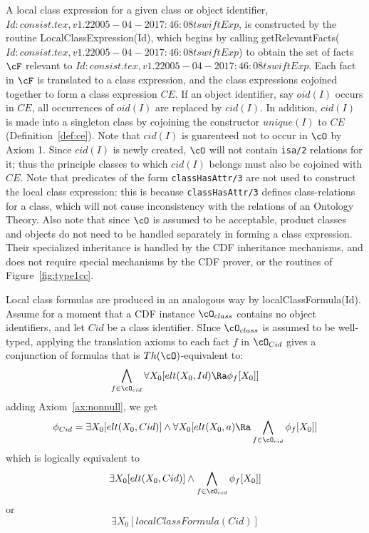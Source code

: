 A local class expression for a given class or object identifier, $Id: consist.tex,v 1.2 2005-04-20 17:46:08 tswift Exp $,
is constructed by the routine {\sf LocalClassExpression(Id)}, which
begins by calling {\sf getRelevantFacts($Id: consist.tex,v 1.2 2005-04-20 17:46:08 tswift Exp $)} to obtain the set of
facts $\cF$ relevant to $Id: consist.tex,v 1.2 2005-04-20 17:46:08 tswift Exp $.  Each fact in $\cF$ is translated to a
class expression, and the class expressions cojoined together to form
a class expression $CE$.  If an object identifier, say $oid(I)$ occurs
in $CE$, all occurrences of $oid(I)$ are replaced by $cid(I)$.  In
addition, $cid(I)$ is made into a singleton class by cojoining the
constructor $unique(I)$ to $CE$ (Definition~\ref{def:ce}).  Note that
$cid(I)$ is guarenteed not to occur in $\cO$ by Axiom 1.  Since
$cid(I)$ is newly created, $\cO$ will not contain {\tt isa/2}
relations for it; thus the principle classes to which $cid(I)$ belongs
must also be cojoined with $CE$.  Note that predicates of the form
{\tt classHasAttr/3} are not used to construct the local class
expression: this is because {\tt classHasAttr/3} defines
class-relations for a class, which will not cause inconsistency with
the relations of an Ontology Theory.  Also note that since $\cO$ is
assumed to be acceptable, product classes and objects do not need to
be handled separately in forming a class expression.  Their
specialized inheritance is handled by the CDF inheritance mechanisms,
and does not require special mechanisms by the CDF prover, or the
routines of Figure~\ref{fig:type1cc}.


Local class formulas are produced in an analogous way by {\sf
localClassFormula(Id)}.  Assume for a moment that a CDF instance
$\cO_{class}$ contains no object identifiers, and let $Cid$ be a class
identifier.  SInce $\cO_{class}$ is assumed to be well-typed, applying
the translation axioms to each fact $f$ in $\cO_{Cid}$ gives a
conjunction of formulas that is $Th(\cO)$-equivalent to:
\[ 
\bigwedge_{f \in \cO_{cid}} \forall X_0 [elt(X_0,Id) \Ra \phi_f[X_0]]
\]
adding Axiom~\ref{ax:nonnull}, we get 
\[ 
\phi_{Cid} = \exists X_0 [elt(X_0,Cid)] \wedge \forall X_0 [elt(X_0,a) \Ra
				\bigwedge_{f \in \cO_{cid}} \phi_f[X_0]] 
\]
which is logically equivalent to 
\[ 
\exists X_0 [elt(X_0,Cid)] \wedge \bigwedge_{f \in \cO_{cid}} \phi_f[X_0]] 
\]
or 
\[ 
\exists X_0 [localClassFormula(Cid)] 
\]

